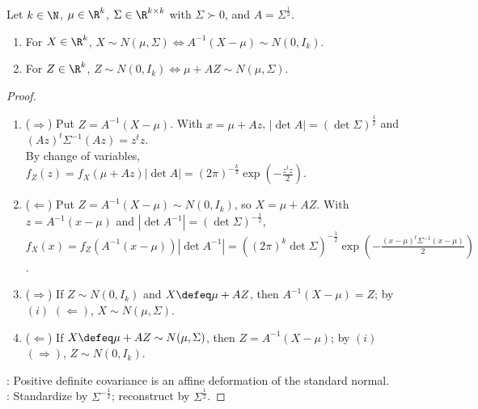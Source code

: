 \begin{proposition} \label{prop:multivariate-normal-affine-standardization} \\
Let $k\in\N$, $\mu\in\R^k$, $\Sigma\in\R^{k\times k}$ with $\Sigma\succ0$, and $A=\Sigma^{\frac{1}{2}}$.
\begin{enumerate}[label=(\roman*)]
\setlength{\itemsep}{0pt}
\item For $X\in\R^k$, $X\sim N(\mu,\Sigma)\iff A^{-1}(X-\mu)\sim N(0,I_k)$.
\item For $Z\in\R^k$, $Z\sim N(0,I_k)\iff\mu+AZ\sim N(\mu,\Sigma)$.
\end{enumerate}
\begin{proof}
\begin{enumerate}[label=(\roman*)]
\setlength{\itemsep}{0pt}
\item[$(i)$] ($\Rightarrow$) Put $Z=A^{-1}(X-\mu)$. With $x=\mu+Az$, $|\det A|=(\det\Sigma)^{\frac{1}{2}}$ and $(Az)^t\Sigma^{-1}(Az)=z^tz$.\\
By change of variables, $f_Z(z)=f_X(\mu+Az)|\det A|=(2\pi)^{-\frac{k}{2}}\exp(-\frac{z^tz}{2})$.
\item[$(i)$] ($\Leftarrow$) Put $Z=A^{-1}(X-\mu)\sim N(0,I_k)$, so $X=\mu+AZ$. With $z=A^{-1}(x-\mu)$ and $|\det A^{-1}|=(\det\Sigma)^{-\frac{1}{2}}$, $f_X(x)=f_Z(A^{-1}(x-\mu))|\det A^{-1}|=((2\pi)^k\det\Sigma)^{-\frac{1}{2}}\exp(-\frac{(x-\mu)^t\Sigma^{-1}(x-\mu)}{2})$.
\item[$(ii)$] ($\Rightarrow$) If $Z\sim N(0,I_k)$ and $X\defeq\mu+AZ$, then $A^{-1}(X-\mu)=Z$; by $(i)$ $(\Leftarrow)$, $X\sim N(\mu,\Sigma)$.
\item[$(ii)$] ($\Leftarrow$) If $X\defeq\mu+AZ\sim N(\mu,\Sigma)$, then $Z=A^{-1}(X-\mu)$; by $(i)$ $(\Rightarrow)$, $Z\sim N(0,I_k)$.
\end{enumerate}
: Positive definite covariance is an affine deformation of the standard normal.\\
: Standardize by $\Sigma^{-\frac{1}{2}}$; reconstruct by $\Sigma^{\frac{1}{2}}$.
\end{proof}
\end{proposition}

